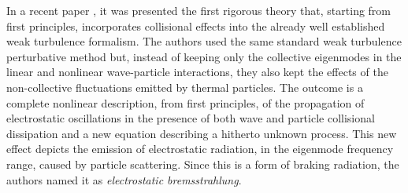 \documentclass[12pt,a4paper,ruledheader]{report}
\begin{document}
In a recent paper \cite{YZKS16}, it was presented the first rigorous
theory that, starting from first principles, incorporates collisional
effects into the already well established weak turbulence formalism.
The authors used the same standard weak turbulence perturbative method
but, instead of keeping only the collective eigenmodes in the linear
and nonlinear wave-particle interactions, they also kept the effects
of the non-collective fluctuations emitted by thermal particles. The
outcome is a complete nonlinear description, from first principles, of
the propagation of electrostatic oscillations in the presence of both
wave and particle collisional dissipation and a new equation describing
a hitherto unknown process. This new effect depicts the emission of
electrostatic radiation, in the eigenmode frequency range, caused by
particle scattering. Since this is a form of braking radiation, the
authors named it as \emph{electrostatic bremsstrahlung}.

\end{document}
